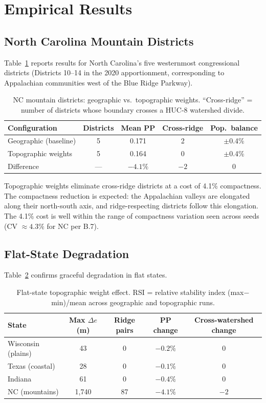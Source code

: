 \section{Empirical Results}

\subsection{North Carolina Mountain Districts}

Table~\ref{tab:nc-topo} reports results for North Carolina's five westernmost congressional districts (Districts 10--14 in the 2020 apportionment, corresponding to Appalachian communities west of the Blue Ridge Parkway).

\begin{table}[h]
\centering\small
\caption{NC mountain districts: geographic vs.\ topographic weights. ``Cross-ridge'' = number of districts whose boundary crosses a HUC-8 watershed divide.}
\label{tab:nc-topo}
\begin{tabular}{lcccc}
\toprule
Configuration & Districts & Mean PP & Cross-ridge & Pop.\ balance \\
\midrule
Geographic (baseline)  & 5 & 0.171 & 2 & $\pm$0.4\% \\
Topographic weights    & 5 & 0.164 & 0 & $\pm$0.4\% \\
\midrule
Difference             & — & $-4.1\%$ & $-2$ & 0 \\
\bottomrule
\end{tabular}
\end{table}

Topographic weights eliminate cross-ridge districts at a cost of 4.1\% compactness. The compactness reduction is expected: the Appalachian valleys are elongated along their north-south axis, and ridge-respecting districts follow this elongation. The 4.1\% cost is well within the range of compactness variation seen across seeds (CV $\approx 4.3\%$ for NC per B.7).

\subsection{Flat-State Degradation}

Table~\ref{tab:flat-states} confirms graceful degradation in flat states.

\begin{table}[h]
\centering\small
\caption{Flat-state topographic weight effect. RSI = relative stability index (max$-$min)/mean across geographic and topographic runs.}
\label{tab:flat-states}
\begin{tabular}{lcccc}
\toprule
State & Max $\Delta e$ (m) & Ridge pairs & PP change & Cross-watershed change \\
\midrule
Wisconsin (plains)  & 43  & 0 & $-0.2\%$ & 0 \\
Texas (coastal)     & 28  & 0 & $-0.1\%$ & 0 \\
Indiana             & 61  & 0 & $-0.4\%$ & 0 \\
\midrule
NC (mountains)      & 1{,}740 & 87 & $-4.1\%$ & $-2$ \\
\bottomrule
\end{tabular}
\end{table}


